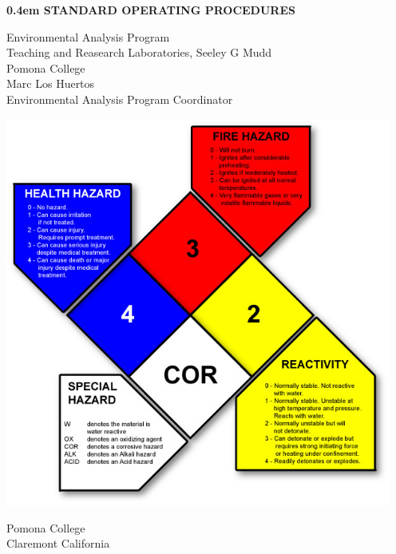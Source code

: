 \documentclass{book}
\begin{document}
\clearpage
\newcommand\nbvspace[1][3]{\vspace*{\stretch{#1}}}
\newcommand\nbstretchyspace{\spaceskip0.5em plus 0.25em minus 0.25em}
\newcommand{\nbtitlestretch}{\spaceskip0.4em}
\pagestyle{empty}
\begin{center}
\bfseries
\nbvspace[0]
\LARGE
{\nbtitlestretch\LARGE
STANDARD OPERATING PROCEDURES}

\nbvspace[1]
\normalsize

Environmental Analysis Program\\
Teaching and Reasearch Laboratories, Seeley G Mudd\\
Pomona College\\
\nbvspace[1]
\large Marc Los Huertos\\[0.5em]
\footnotesize Environmental Analysis Program Coordinator

\nbvspace[2]

\includegraphics[width=5.0in]{Hazard_sign}
\nbvspace[3]
\normalsize

Pomona College\\
\large
Claremont California
\nbvspace[1]
\end{center}

\newpage

\end{document}
